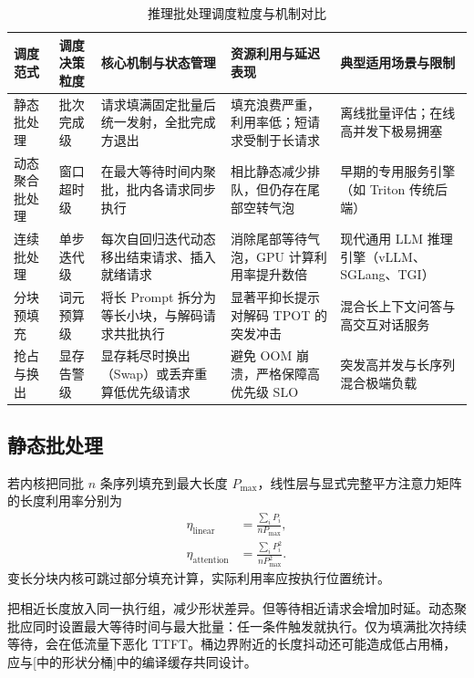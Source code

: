 \documentclass[../textbook.tex]{subfiles}
\begin{document}
\begin{table}[htbp]
\centering
\caption{推理批处理调度粒度与机制对比}\label{tab:batching-paradigms}
\begin{tabularx}{\linewidth}{@{}lXXXX@{}}
\toprule
调度范式 & 调度决策粒度 & 核心机制与状态管理 & 资源利用与延迟表现 & 典型适用场景与限制 \\
\midrule
静态批处理 & 批次完成级 & 请求填满固定批量后统一发射，全批完成方退出 & 填充浪费严重，利用率低；短请求受制于长请求 & 离线批量评估；在线高并发下极易拥塞 \\
动态聚合批处理 & 窗口超时级 & 在最大等待时间内聚批，批内各请求同步执行 & 相比静态减少排队，但仍存在尾部空转气泡 & 早期的专用服务引擎（如 Triton 传统后端） \\
连续批处理 & 单步迭代级 & 每次自回归迭代动态移出结束请求、插入就绪请求 & 消除尾部等待气泡，GPU 计算利用率提升数倍 & 现代通用 LLM 推理引擎（vLLM、SGLang、TGI） \\
分块预填充 & 词元预算级 & 将长 Prompt 拆分为等长小块，与解码请求共批执行 & 显著平抑长提示对解码 TPOT 的突发冲击 & 混合长上下文问答与高交互对话服务 \\
抢占与换出 & 显存告警级 & 显存耗尽时换出（Swap）或丢弃重算低优先级请求 & 避免 OOM 崩溃，严格保障高优先级 SLO & 突发高并发与长序列混合极端负载 \\
\bottomrule
\end{tabularx}
\end{table}

\subsection{静态批处理}
若内核把同批 $n$ 条序列填充到最大长度 $P_{\max}$，线性层与显式完整平方注意力矩阵的长度利用率分别为
\begin{equation}
 \begin{aligned}
  \eta_{\mathrm{linear}}&=\frac{\sum_iP_i}{nP_{\max}},\\
  \eta_{\mathrm{attention}}&=\frac{\sum_iP_i^2}{nP_{\max}^2}.
 \end{aligned}
\end{equation}
变长分块内核可跳过部分填充计算，实际利用率应按执行位置统计。

把相近长度放入同一执行组，减少形状差异。但等待相近请求会增加时延。动态聚批应同时设置最大等待时间与最大批量：任一条件触发就执行。仅为填满批次持续等待，会在低流量下恶化 TTFT。桶边界附近的长度抖动还可能造成低占用桶，应与[中的形状分桶]中的编译缓存共同设计。
\end{document}
